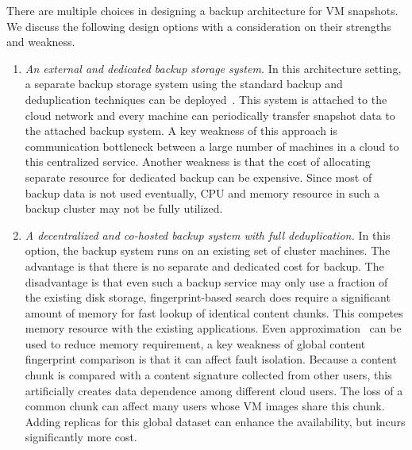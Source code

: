 There are multiple choices in designing a backup architecture  for VM snapshots.
We discuss the following design options with a consideration on their strengths and weakness.
\begin{enumerate}
\item  {\em An external and dedicated backup storage system.} 
In this architecture setting, a separate backup storage system using
the standard backup and deduplication techniques can be deployed~\cite{bottleneck08,extreme_binning09,sparseindex09}. 
This system is attached to the cloud network and every machine can periodically transfer snapshot data to 
the attached backup system. 
A key weakness of this approach is communication bottleneck between a large number of machines
in a cloud to this centralized  service.
Another weakness is that the cost of allocating separate resource for dedicated backup  can be expensive.
Since most of backup data is not used eventually, CPU and memory resource in such a backup cluster may not be fully utilized.
\item {\em A decentralized and co-hosted backup system with full deduplication.}
In this option, the backup system runs on an existing set of cluster machines. 
The advantage is that there is no separate and dedicated cost for backup.
The disadvantage is that 
even such a  backup service may only use  a fraction of the existing disk storage, 
fingerprint-based search does require a significant amount of memory for fast lookup of identical content chunks.
This competes memory resource  with the existing applications.
Even approximation~\cite{extreme_binning09,sparseindex09} can be used to reduce memory requirement,  
a  key weakness of global content fingerprint comparison is that it can affect fault isolation.
Because a content chunk is compared with a content signature collected from other users,
this artificially creates data dependence among different cloud users.
The loss of a common chunk can affect many users whose VM images share this 
chunk. Adding replicas for this global dataset can enhance the availability,
but incurs significantly more cost.


\end{enumerate}
